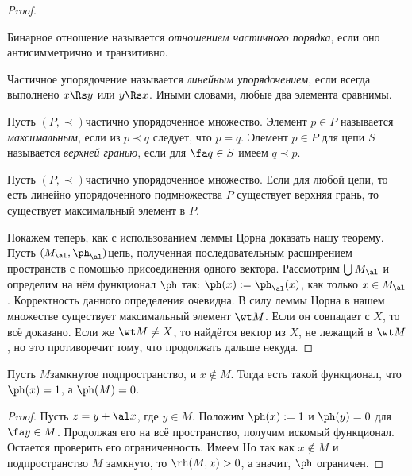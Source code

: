 \documentclass[a4paper]{article}
\begin{document}
\begin{proof}
\begin{df}
Бинарное отношение называется \emph{отношением частичного порядка},
если оно антисимметрично и транзитивно.
\end{df}

\begin{df}
Частичное упорядочение называется \emph{линейным упорядочением}, если всегда выполнено $x \Rs y$ или $y \Rs x$.
Иными словами, любые два элемента сравнимы.
\end{df}

\begin{df}
Пусть $(P, \prec)$\т частично упорядоченное множество.
Элемент $p \in P$ называется \emph{максимальным}, если из $p \prec q$ следует, что $p=q$.
Элемент $p\in P$ для цепи $S$ называется \emph{верхней гранью}, если для $\fa q \in S$ имеем $q \prec p$.
\end{df}

\begin{stm}
Пусть $(P, \prec)$\т частично упорядоченное множество. Если для любой цепи, то есть линейно упорядоченного
подмножества $P$ существует верхняя грань, то существует максимальный элемент в $P$.
\end{stm}

Покажем теперь, как с использованием леммы Цорна доказать нашу теорему. Пусть
$(M_\al, \ph_\al)$\т цепь, полученная последовательным расширением пространств
с помощью присоединения одного вектора. Рассмотрим $\bigcup M_\al$
и определим на нём функционал $\ph$ так: $\ph(x) := \ph_\al(x)$, как только $x \in M_\al$.
Корректность данного определения очевидна. В силу леммы Цорна в нашем множестве существует максимальный элемент
$\wt M$. Если он совпадает с $X$, то всё доказано. Если же $\wt M \neq X$, то найдётся вектор
из $X$, не лежащий в $\wt M$, но это противоречит тому, что продолжать дальше некуда.
\end{proof}

\begin{imp}
Пусть $M$\т замкнутое подпространство, и $x\notin M$. Тогда есть такой функционал, что $\ph(x)=1$, а $\ph(M)=0$.
\end{imp}
\begin{proof}
Пусть $z = y + \al x$, где $y\in M$. Положим $\ph(x) := 1$ и $\ph(y)=0$ для $\fa y \in M$.
Продолжая его на всё пространство, получим искомый функционал. Остается проверить его ограниченность.
Имеем
 Но так как $x\notin M$ и
подпространство $M$ замкнуто, то $\rh(M,x)> 0$, а значит, $\ph$ ограничен.
\end{proof}
\end{document}

